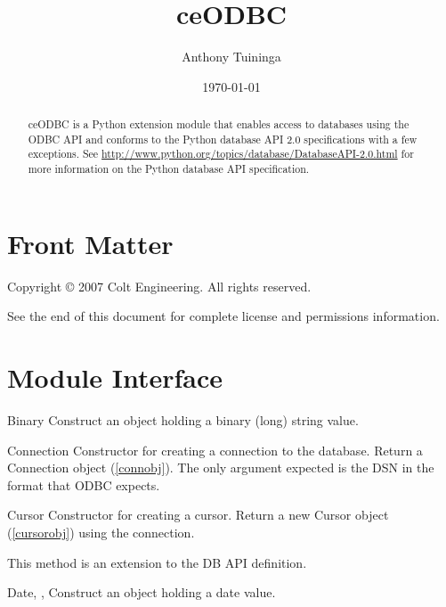 \documentclass{manual}
\title{ceODBC}
\author{Anthony Tuininga}
\date{\today}                   %
\begin{document}
\maketitle

\ifhtml
\chapter*{Front Matter\label{front}}
\fi

Copyright \copyright{} 2007 Colt Engineering.
All rights reserved.

See the end of this document for complete license and permissions
information.

\begin{abstract}

\noindent
ceODBC is a Python extension module that enables access to databases using the
ODBC API and conforms to the Python database API 2.0 specifications with a few
exceptions.
See \url{http://www.python.org/topics/database/DatabaseAPI-2.0.html} for more
information on the Python database API specification.

\end{abstract}

\tableofcontents

\chapter{Module Interface\label{module}}

\begin{funcdesc}{Binary}{}
  Construct an object holding a binary (long) string value.
\end{funcdesc}

\begin{funcdesc}{Connection}{}
  Constructor for creating a connection to the database. Return a Connection
  object (\ref{connobj}). The only argument expected is the DSN in the format
  that ODBC expects.
\end{funcdesc}

\begin{funcdesc}{Cursor}{}
  Constructor for creating a cursor.  Return a new Cursor object
  (\ref{cursorobj}) using the connection.

   This method is an extension to the DB API definition.
\end{funcdesc}

\begin{funcdesc}{Date}{, , }
  Construct an object holding a date value.
\end{funcdesc}
\end{document}
